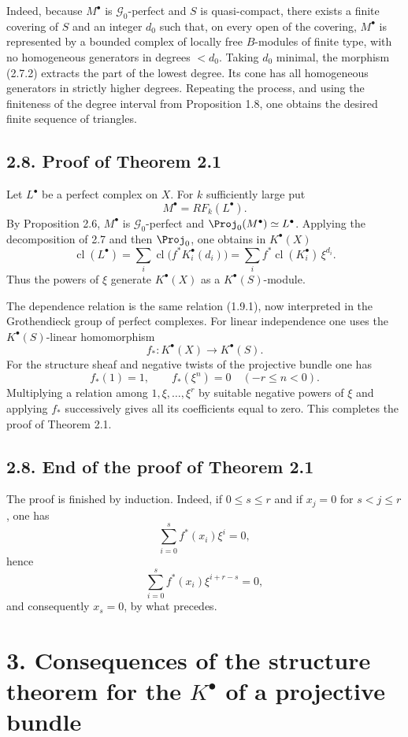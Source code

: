 \documentclass[11pt]{article}
\newcommand{\cl}{\operatorname{cl}}
\begin{document}
Indeed, because \(M^\bullet\) is \(\mathcal G_0\)-perfect and \(S\) is quasi-compact, there exists a finite covering of \(S\) and an integer \(d_0\) such that, on every open of the covering, \(M^\bullet\) is represented by a bounded complex of locally free \(B\)-modules of finite type, with no homogeneous generators in degrees \(<d_0\). Taking \(d_0\) minimal, the morphism (2.7.2) extracts the part of the lowest degree. Its cone has all homogeneous generators in strictly higher degrees. Repeating the process, and using the finiteness of the degree interval from Proposition 1.8, one obtains the desired finite sequence of triangles.

\subsection*{2.8. Proof of Theorem 2.1}
Let \(L^\bullet\) be a perfect complex on \(X\). For \(k\) sufficiently large put
\[
  M^\bullet=RF_k(L^\bullet).
\]
By Proposition 2.6, \(M^\bullet\) is \(\mathcal G_0\)-perfect and \(\Proj_0(M^\bullet)\simeq L^\bullet\). Applying the decomposition of 2.7 and then \(\Proj_0\), one obtains in \(K^\bullet(X)\)
\[
  \cl(L^\bullet)
  =
  \sum_i \cl\bigl(f^*K_i^\bullet(d_i)\bigr)
  =
  \sum_i f^*\cl(K_i^\bullet)\,\xi^{d_i}.
\]
Thus the powers of \(\xi\) generate \(K^\bullet(X)\) as a \(K^\bullet(S)\)-module.

The dependence relation is the same relation (1.9.1), now interpreted in the Grothendieck group of perfect complexes. For linear independence one uses the \(K^\bullet(S)\)-linear homomorphism
\[
  f_*:K^\bullet(X)\longrightarrow K^\bullet(S).
\]
For the structure sheaf and negative twists of the projective bundle one has
\[
  f_*(1)=1,\qquad f_*(\xi^n)=0\quad(-r\leq n<0).
\]
Multiplying a relation among \(1,\xi,\ldots,\xi^r\) by suitable negative powers of \(\xi\) and applying \(f_*\) successively gives all its coefficients equal to zero. This completes the proof of Theorem 2.1.



\subsection*{2.8. End of the proof of Theorem 2.1}
The proof is finished by induction. Indeed, if \(0\leq s\leq r\) and if \(x_j=0\) for \(s<j\leq r\), one has
\[
  \sum_{i=0}^{s} f^*(x_i)\xi^i=0,
\]
hence
\[
  \sum_{i=0}^{s} f^*(x_i)\xi^{i+r-s}=0,
\]
and consequently \(x_s=0\), by what precedes.

\section*{3. Consequences of the structure theorem for the \(K^\bullet\) of a projective bundle}
\end{document}
